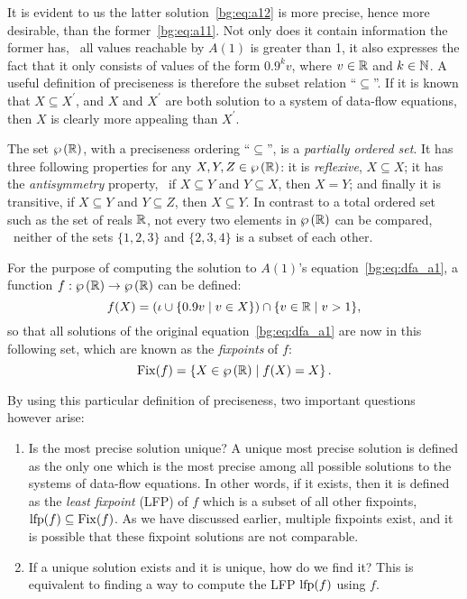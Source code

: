It is evident to us the latter solution~\eqref{bg:eq:a12} is more precise,
hence more desirable, than the former~\eqref{bg:eq:a11}.  Not only does it
contain information the former has, \ie~all values reachable by $A(1)$ is
greater than 1, it also expresses the fact that it only consists of values of
the form $0.9^k v$, where $v \in \mathbb{R}$ and $k \in \mathbb{N}$.  A useful
definition of preciseness is therefore the subset relation ``$\subseteq$''.
If it is known that $X \subseteq X^\prime$, and $X$ and $X^\prime$ are both
solution to a system of data-flow equations, then $X$ is clearly more appealing
than $X^\prime$.

The set $\wp\left({\mathbb{R}}\right)$, with a preciseness ordering ``$\subseteq$'', is
a \emph{partially ordered set}.  It has three following properties for any $X,
Y, Z \in \wp\left({\mathbb{R}}\right)$: it is \emph{reflexive}, $X \subseteq X$; it has
the \emph{antisymmetry} property, \ie~if $X \subseteq Y$ and $Y \subseteq X$,
then $X = Y$; and finally it is transitive, if $X \subseteq Y$ and $Y \subseteq
Z$, then $X \subseteq Y$.  In contrast to a total ordered set such as the set
of reals $\mathbb{R}$, not every two elements in $\wp\left({\mathbb{R}}\right)$ can be
compared, \eg~neither of the sets $\{1, 2, 3\}$ and $\{2, 3, 4\}$ is a subset
of each other.

For the purpose of computing the solution to $A(1)$'s
equation~\eqref{bg:eq:dfa_a1}, a function $f: \wp\left({\mathbb{R}}\right) \to
\wp\left({\mathbb{R}}\right)$ can be defined:
\begin{equation}
    f(X) = \left(
        \iota \cup \left\{ 0.9 v \mid v \in X \right\}
    \right) \cap \{ v \in \mathbb{R} \mid v > 1 \},
    \label{bg:eq:transfer}
\end{equation}
so that all solutions of the original equation~\eqref{bg:eq:dfa_a1} are now in
this following set, which are known as the \emph{fixpoints} of $f$:
\begin{equation}
    \mathrm{Fix}(f) = \left\{
        X \in \wp\left({\mathbb{R}}\right) \mid
        f(X) = X
    \right\}.
\end{equation}

By using this particular definition of preciseness, two important questions
however arise:
\begin{enumerate}

    \item Is the most precise solution unique?  A unique most precise solution
    is defined as the only one which is the most precise among all possible
    solutions to the systems of data-flow equations.  In other words, if
    it exists, then it is defined as the \emph{least fixpoint} (LFP) of
    $f$ which is a subset of all other fixpoints, \ie~$\operatorname{\mathrm{lfp}} (f) \subseteq
    \mathrm{Fix}(f)$.  As we have discussed earlier, multiple fixpoints exist,
    and it is possible that these fixpoint solutions are not comparable.

    \item If a unique solution exists and it is unique, how do we find it?
    This is equivalent to finding a way to compute the LFP $\operatorname{\mathrm{lfp}}(f)$ using $f$.

\end{enumerate}


